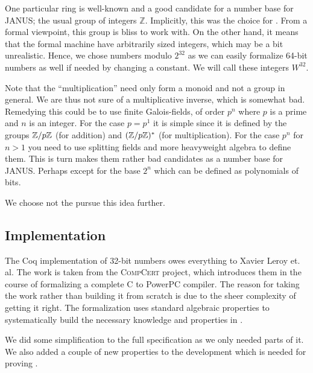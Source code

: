 One particular ring is well-known and a good candidate for a number
base for JANUS; the usual group of integers $\mathbb{Z}$. Implicitly,
this was the choice for \janusz{}. From a formal viewpoint, this group
is bliss to work with. On the other hand, it means that the formal
machine have arbitrarily sized integers, which may be a bit
unrealistic. Hence, we chose numbers modulo $2^{32}$ as we can easily
formalize 64-bit numbers as well if needed by changing a constant. We
will call these integers $W^{32}$.

\begin{rem}
  Note that the ``multiplication'' need only form a monoid and not a
  group in general. We are thus not sure of a multiplicative inverse,
  which is somewhat bad. Remedying this could be to use finite
  Galois-fields, of order $p^n$ where $p$ is a prime and
  $n$ is an integer. For the case $p = p^1$ it is simple since it is
  defined by the groups $\mathbb{Z} / p\mathbb{Z}$ (for addition) and $(\mathbb{Z} /
  p\mathbb{Z})^{*}$ (for multiplication). For the case $p^n$ for $n > 1$ you
  need to use splitting fields and more heavyweight algebra to define
  them. This is turn makes them rather bad candidates as a number base
  for JANUS. Perhaps except for the base $2^n$ which can be defined as
  polynomials of bits.

  We choose not the pursue this idea further.
\end{rem}

\subsection{\coq{} Implementation}

The Coq implementation of 32-bit numbers owes everything to Xavier
Leroy et. al\cite{leroy:compcert}. The work is taken from the
\textsc{CompCert} project, which introduces them in the course of
formalizing a complete C to PowerPC compiler. The reason for taking
the work rather than building it from scratch is due to the sheer
complexity of getting it right. The formalization uses standard
algebraic properties to systematically build the necessary knowledge
and properties in \coq{}.

We did some simplification to the full specification as we only needed
parts of it. We also added a couple of new properties to the
development which is needed for proving \januso{}.


